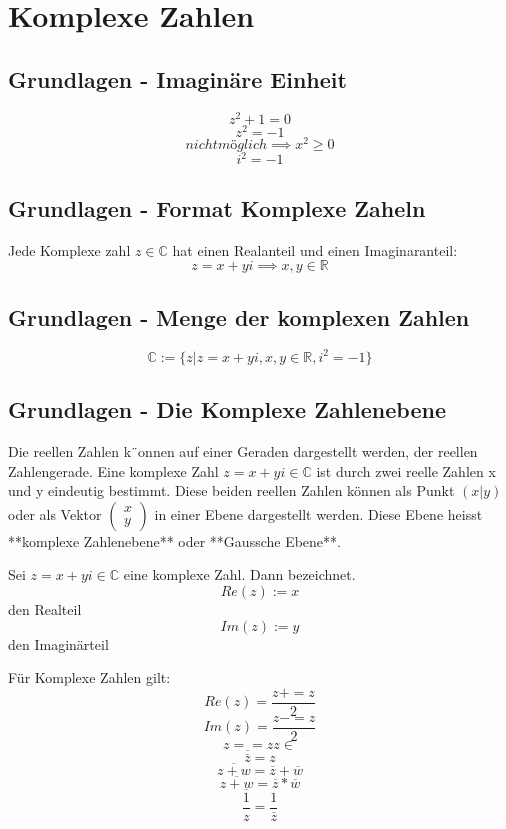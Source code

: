 \documentclass[9pt,a4paper]{article}
\begin{document}
    \tableofcontents
    \section{Komplexe Zahlen}
    \subsection{Grundlagen - Imaginäre Einheit}
    $$z^2 + 1 = 0$$
    $$z^2 = -1$$
    $$nicht möglich\implies	 x^2 \ge 0$$
    $$i^2 = -1$$
    
    \subsection{Grundlagen - Format Komplexe Zaheln}
    Jede Komplexe zahl $z \in \mathbb{C}$ hat einen Realanteil und einen Imaginaranteil:
    $$z=x+yi \implies x,y \in \mathbb{R}$$
    
    \subsection{Grundlagen - Menge der komplexen Zahlen}
    
    $$ \mathbb{C} := \{z| z=x +yi, x,y \in \mathbb{R}, i^2 = -1\}$$
    
    \subsection{Grundlagen - Die Komplexe Zahlenebene}
    
    Die reellen Zahlen k¨onnen auf einer Geraden dargestellt werden, der reellen Zahlengerade. Eine komplexe
    Zahl $z=x+yi \in \mathbb{C}$ ist durch zwei reelle Zahlen x und y eindeutig bestimmt. Diese beiden reellen Zahlen
    können als Punkt $(x|y)$ oder als Vektor $\begin{pmatrix} x \\ y \end{pmatrix}$ in einer Ebene dargestellt werden. Diese Ebene heisst **komplexe Zahlenebene** oder **Gaussche Ebene**.
    
    Sei $z=x+yi \in \mathbb{C}$ eine komplexe Zahl. Dann bezeichnet.
    $$Re(z):=x$$
    den Realteil
    $$Im(z):=y$$
    den Imaginärteil
    
    Für Komplexe Zahlen gilt:
    $$Re(z)=\frac{z+=z}{2}$$
    $$Im(z)=\frac{z-=z}{2}$$
    $$z==z z \in$$
    $$\overline{\overline{z}}=z$$
    $$\overline{z+w}=\overline{z}+\overline{w}$$
    $$\overline{z+w}=\overline{z}*\overline{w}$$
    $$\overline{\frac{1}{z}}=\frac{1}{\overline{z}}$$
    
\end{document}
